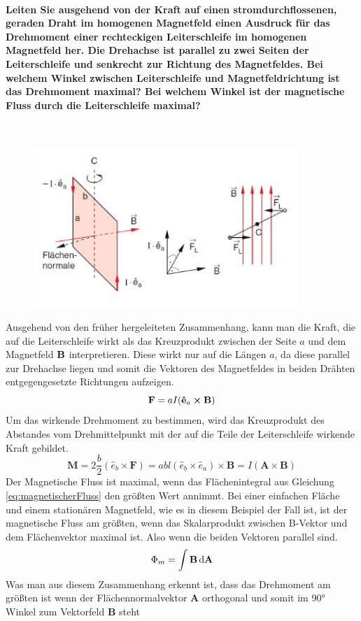 \documentclass[a4paper, 11pt, ngerman, parskip=half-]{scrartcl}
\begin{document}
\paragraph{Leiten Sie ausgehend von der Kraft auf einen stromdurchflossenen, geraden Draht im
    homogenen Magnetfeld einen Ausdruck für das Drehmoment einer rechteckigen Leiterschleife im
    homogenen Magnetfeld her. Die Drehachse ist parallel zu zwei Seiten der Leiterschleife und senkrecht
    zur Richtung des Magnetfeldes. Bei welchem Winkel zwischen Leiterschleife und Magnetfeldrichtung ist
    das Drehmoment maximal? Bei welchem Winkel ist der magnetische Fluss durch die Leiterschleife
    maximal?}~\\
\begin{figure}[H]
    \centering
    \label{Drehmoment}
    \includegraphics[height=6cm]{image/05/5.5.JPG}
\end{figure}
Ausgehend von den früher hergeleiteten Zusammenhang, kann man die Kraft, die auf die Leiterschleife wirkt als das Kreuzprodukt zwischen der Seite $a$ und dem Magnetfeld $\vb{B}$ interpretieren.
Diese wirkt nur auf die Längen $a$, da diese parallel zur Drehachse liegen und somit die Vektoren des Magnetfeldes in beiden Drähten entgegengesetzte Richtungen aufzeigen.
\begin{equation}
    \vb{F} = a I ( \vb{\hat{e}}_a \cross \vb{B})
\end{equation}
Um das wirkende Drehmoment zu bestimmen, wird das Kreuzprodukt des Abstandes vom Drehmittelpunkt mit der auf die Teile der Leiterschleife wirkende Kraft gebildet.
\begin{equation}
    \textbf{M} = 2\frac{b}{2} ( \hat{e}_b \times \textbf{F}) = abl (\hat{e}_b \times \hat{e}_a) \times \textbf{B} = I(\textbf{A}\times\textbf{B})
\end{equation}
Der Magnetische Fluss ist maximal, wenn das Flächenintegral aus Gleichung \ref{eq:magnetischerFluss} den größten Wert annimmt. Bei einer einfachen Fläche und einem stationären Magnetfeld, wie es in diesem Beispiel der Fall ist, ist der magnetische Fluss am größten, wenn das
Skalarprodukt zwischen B-Vektor und dem Flächenvektor maximal ist. Also wenn die beiden Vektoren parallel sind.
\begin{equation}
    \label{eq:magnetischerFluss}
    \Phi_m = \int \vb{B} \dd{\vb{A}}
\end{equation}
Was man aus diesem Zusammenhang erkennt ist, dass das Drehmoment am größten ist wenn der Flächennormalvektor $\textbf{A}$ orthogonal und somit im 90° Winkel zum Vektorfeld $\textbf{B}$ steht
\end{document}
